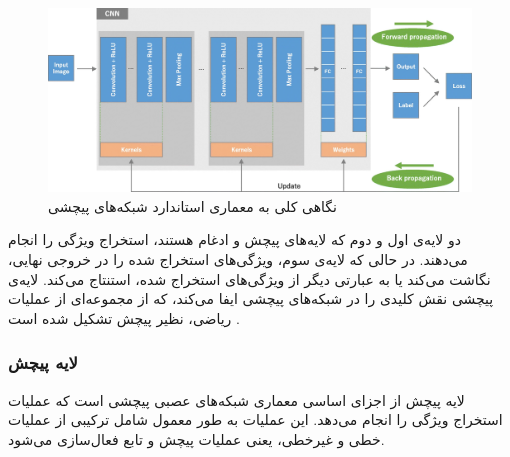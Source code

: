 \begin{figure}[h]
    \centering
    \includegraphics[width=1\linewidth]{figures/standard_cnn.png}
    \caption{نگاهی کلی به معماری استاندارد شبکه‌های پیچشی \cite{yamashita2018convolutional}}
    \label{fig:standard_cnn}
\end{figure}

دو لایه‌ی اول و دوم که لایه‌های پیچش و ادغام هستند، استخراج ویژگی را انجام می‌دهند. در حالی که لایه‌ی سوم، ویژگی‌های استخراج شده را در خروجی نهایی، نگاشت می‌کند یا به عبارتی دیگر از ویژگی‌های استخراج شده، استنتاج می‌کند. لایه‌ی پیچشی نقش کلیدی را در شبکه‌های پیچشی ایفا می‌کند، که از مجموعه‌ای از  عملیات ریاضی، نظیر پیچش تشکیل شده است \cite{yamashita2018convolutional}.

\subsubsection{لایه‌ پیچش}

 لایه پیچش از اجزای اساسی معماری شبکه‌های عصبی پیچشی است که عملیات استخراج ویژگی را انجام می‌دهد. این عملیات به طور معمول شامل ترکیبی از عملیات خطی و غیرخطی، یعنی عملیات پیچش و تابع فعال‌سازی می‌شود.

